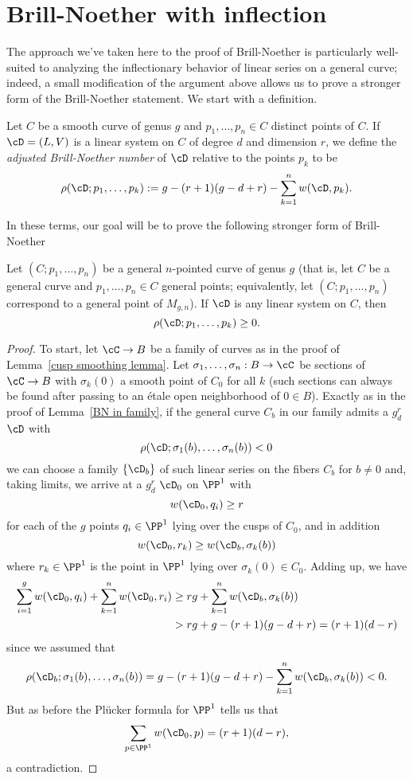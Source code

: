 \section{Brill-Noether with inflection}

The approach we've taken here to the proof of Brill-Noether is particularly well-suited to analyzing the inflectionary behavior of linear series on a general curve; indeed, a small modification of the argument above allows us to prove a stronger form of the Brill-Noether statement. We start with a definition.

\begin{definition}
Let $C$ be a smooth curve of genus $g$ and $p_1,\dots,p_n \in C$ distinct points of $C$. If $\cD = (L,V)$ is a linear system on $C$ of degree $d$ and dimension $r$, we define the \emph{adjusted Brill-Noether number} of $\cD$ relative to the points $p_k$ to be
$$
\rho(\cD; p_1,\dots,p_k) := g - (r+1)(g-d+r) - \sum_{k=1}^n w(\cD,p_k).
$$
\end{definition}

In these terms, our goal will be to prove the following stronger form of Brill-Noether

\begin{theorem}\label{Brill-Noether with inflection}
Let $(C;p_1,\dots,p_n)$ be a general $n$-pointed curve of genus $g$ (that is, let $C$ be a general curve and $p_1,\dots,p_n \in C$ general points; equivalently, let $(C;p_1,\dots,p_n)$ correspond to a general point of $M_{g,n}$). If $\cD$ is any linear system on $C$, then
$$
\rho(\cD; p_1,\dots,p_k) \geq 0.
$$
\end{theorem}


\begin{proof}
To start, let $\cC \to B$ be a family of curves as in the proof of Lemma~\ref{cusp smoothing lemma}. Let $\sigma_1, \dots, \sigma_n : B \to \cC$ be sections of $\cC \to B$ with $\sigma_k(0)$ a smooth point of $C_0$ for all $k$ (such sections can always be found after passing to an \'etale open neighborhood of $0 \in B$). Exactly as in the proof of Lemma~\ref{BN in family}, if the general curve $C_b$ in our family admits a $g^r_d$ $\cD$ with
$$
\rho(\cD;\sigma_1(b),\dots,\sigma_n(b)) < 0
$$
we can choose a family $\{\cD_b\}$ of such linear series on the fibers $C_b$ for $b \neq 0$ and, taking limits, we arrive at a $g^r_d$ $\cD_0$ on $\PP^1$ with
$$
w(\cD_0, q_i) \geq r
$$
for each of the $g$ points $q_i \in \PP^1$ lying over the cusps of $C_0$, and in addition
$$
w(\cD_0, r_k) \geq w(\cD_b,\sigma_k(b))
$$
where $r_k \in \PP^1$ is the point in $\PP^1$ lying over $\sigma_k(0) \in C_0$. Adding up, we have
\begin{align*}
\sum_{i=1}^g w(\cD_0, q_i) + \sum_{k=1}^n w(\cD_0, r_i) &\geq rg + \sum_{k=1}^n w(\cD_b,\sigma_k(b)) \\
&> rg + g - (r+1)(g-d+r) = (r+1)(d-r)
\end{align*}
since we assumed that 
$$
\rho(\cD_b;\sigma_1(b),\dots,\sigma_n(b)) = g - (r+1)(g-d+r) - \sum_{k=1}^n w(\cD_b,\sigma_k(b)) < 0.
$$
But as before the Pl\"ucker formula for $\PP^1$ tells us that
$$
\sum_{p \in \PP^1} w(\cD_0, p) = (r+1)(d-r),
$$
a contradiction.
\end{proof}

